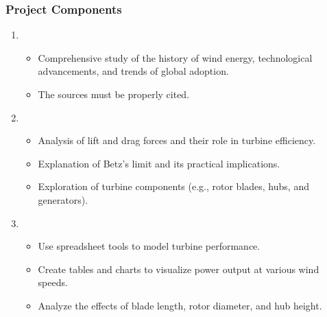 \documentclass[letterpaper,10pt,english]{jupyterBook}
\begin{document}
\subsubsection{Project Components}
\label{\detokenize{ProjectSyllabus:project-components}}\begin{enumerate}
%
\item {} 
\sphinxAtStartPar
{}
\begin{itemize}
\item {} 
\sphinxAtStartPar
Comprehensive study of the history of wind energy, technological
advancements, and trends of global adoption.

\item {} 
\sphinxAtStartPar
The sources must be properly cited.

\end{itemize}

\item {} 
\sphinxAtStartPar
{}
\begin{itemize}
\item {} 
\sphinxAtStartPar
Analysis of lift and drag forces and their role in turbine
efficiency.

\item {} 
\sphinxAtStartPar
Explanation of Betz’s limit and its practical implications.

\item {} 
\sphinxAtStartPar
Exploration of turbine components (e.g., rotor blades, hubs, and
generators).

\end{itemize}

\item {} 
\sphinxAtStartPar
{}
\begin{itemize}
\item {} 
\sphinxAtStartPar
Use spreadsheet tools to model turbine performance.

\item {} 
\sphinxAtStartPar
Create tables and charts to visualize power output at various
wind speeds.

\item {} 
\sphinxAtStartPar
Analyze the effects of blade length, rotor diameter, and hub
height.

\end{itemize}


\end{enumerate}
\end{document}
